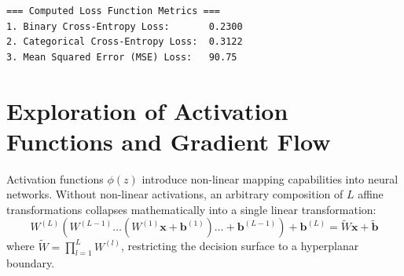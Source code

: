 \documentclass[12pt]{article}
\begin{document}
\begin{lstlisting}[style=output, caption={Loss Function Execution Output}]
=== Computed Loss Function Metrics ===
1. Binary Cross-Entropy Loss:       0.2300
2. Categorical Cross-Entropy Loss:  0.3122
3. Mean Squared Error (MSE) Loss:   90.75
\end{lstlisting}

\section{Exploration of Activation Functions and Gradient Flow}

Activation functions $\phi(z)$ introduce non-linear mapping capabilities into neural networks. Without non-linear activations, an arbitrary composition of $L$ affine transformations collapses mathematically into a single linear transformation:
\begin{equation}
W^{(L)} \left( W^{(L-1)} \dots \left( W^{(1)} \mathbf{x} + \mathbf{b}^{(1)} \right) \dots + \mathbf{b}^{(L-1)} \right) + \mathbf{b}^{(L)} = \widetilde{W} \mathbf{x} + \widetilde{\mathbf{b}}
\end{equation}
where $\widetilde{W} = \prod_{l=1}^L W^{(l)}$, restricting the decision surface to a hyperplanar boundary.
\end{document}
